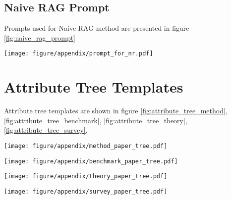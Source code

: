\subsection{Naive RAG Prompt}
\label{subsec:Naive RAG Prompt}
Prompts used for Naive RAG method are presented in figure \ref{fig:naive_rag_prompt}
\begin{figure*}[h]
  \centering
    \texttt{[image: figure/appendix/prompt\_for\_nr.pdf]}
  \caption{Prompts for Naive RAG.}
  \label{fig:naive_rag_prompt}
\end{figure*}
\section{Attribute Tree Templates}
\label{sec:Attribute Tree Templates}
Attribute tree templates are shown in figure \ref{fig:attribute_tree_method}, \ref{fig:attribute_tree_benchmark}, \ref{fig:attribute_tree_theory}, 
\ref{fig:attribute_tree_survey}.
\begin{figure*}[h]
  \centering
  \texttt{[image: figure/appendix/method\_paper\_tree.pdf]}
  \caption{Method paper attribute tree.}
  \label{fig:attribute_tree_method}
\end{figure*}

\begin{figure*}[h]
  \centering
    \texttt{[image: figure/appendix/benchmark\_paper\_tree.pdf]}
  \caption{Benchmark paper attribute tree.}
  \label{fig:attribute_tree_benchmark}
\end{figure*}

\begin{figure*}[h]
  \centering
    \texttt{[image: figure/appendix/theory\_paper\_tree.pdf]}
  \caption{Theory paper attribute tree.}
  \label{fig:attribute_tree_theory}
\end{figure*}

\begin{figure*}[h]
  \centering
    \texttt{[image: figure/appendix/survey\_paper\_tree.pdf]}
  \caption{Survey paper attribute tree.}
  \label{fig:attribute_tree_survey}
\end{figure*}
